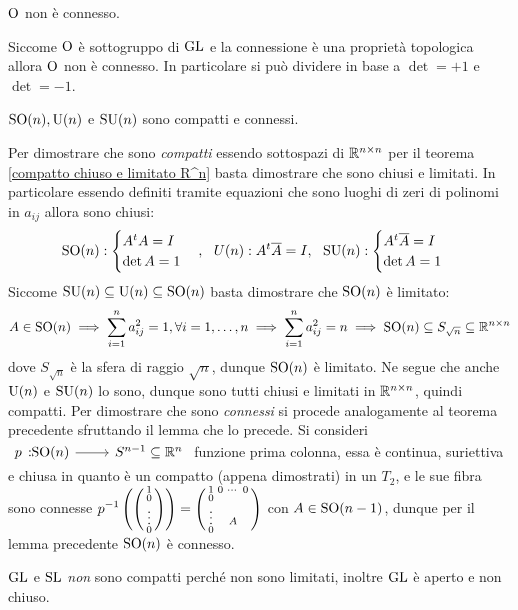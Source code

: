 \begin{corollary}
	$\operatorname{O}$ non è connesso.	
\end{corollary}
\begin{demonstration}
	Siccome $\operatorname{O}$ è sottogruppo di $\operatorname{GL}$ e la connessione è una proprietà topologica allora $\operatorname{O}$ non è connesso. In particolare si può dividere in base a $\det =+1$ e $\det =-1$.
\end{demonstration}

\begin{theorema}
	$\operatorname{SO}(n), \operatorname{U}(n)	$ e $\operatorname{SU}(n)$ sono compatti e connessi.
\end{theorema}
\begin{demonstration}
	Per dimostrare che sono \textit{compatti} essendo sottospazi di $\mathbb{R}^{n\times n}$ per il teorema \ref{compatto chiuso e limitato R^n} basta dimostrare che sono chiusi e limitati. In particolare essendo definiti tramite equazioni che sono luoghi di zeri di polinomi in $a_{ij}$ allora sono chiusi:
		\begin{gather*}
			\operatorname{SO}(n):\begin{cases}
					A^{t}A=I\\
					\det A=1
				\end{cases}, \ \
			U(n): A^{t}\overline{A}=I, \ \
			\operatorname{SU}(n): \begin{cases}
				A^{t}\overline{A}=I\\
				\det A=1
			\end{cases}
		\end{gather*}
	Siccome $\operatorname{SU}(n)\subseteq \operatorname{U}(n)\subseteq \operatorname{SO}(n)$ basta dimostrare che $\operatorname{SO}(n)$ è limitato:
		\begin{gather*}
			A\in\operatorname{SO}(n) \implies \sum_{i=1}^n a_{ij}^2=1, \forall i=1,\dots,n \implies \sum_{i=1}^n a_{ij}^2=n \implies \operatorname{SO}(n)\subseteq S_{\sqrt{n}}\subseteq\mathbb{R}^{n\times n}\\
		\end{gather*}
	dove $S_{\sqrt{n}}$ è la sfera di raggio $\sqrt{n}$, dunque $\operatorname{SO}(n)$ è limitato. Ne segue che anche $\operatorname{U}(n)$ e $\operatorname{SU}(n)$ lo sono, dunque sono tutti chiusi e limitati in $\mathbb{R}^{n\times n}$, quindi compatti. \newline
	Per dimostrare che sono \textit{connessi} si procede analogamente al teorema precedente sfruttando il lemma che lo precede. Si consideri $\funz p {\So(n)} {S^{n-1}\subseteq \realset^n}$ funzione prima colonna, essa è continua, suriettiva e chiusa in quanto è un compatto (appena dimostrati) in un $T_2$, e le sue fibra sono connesse $\displaystyle p^{-1}\left( \begin{psmallmatrix} 1 \\ 0 \\ \vdots \\ 0 \end{psmallmatrix} \right) = \begin{psmallmatrix}
		1      & 0 & \cdots & 0\\
		0      &   &       &  \\
		\vdots &   & A     &  \\
		0      &   &       &
	\end{psmallmatrix}$ con $A\in \operatorname{SO}(n-1)$, dunque per il lemma precedente $\operatorname{SO}(n)$ è connesso.
\end{demonstration}

\begin{observe}
	$\operatorname{GL}$ e $\operatorname{SL}$ \textit{non} sono compatti perché non sono limitati, inoltre $\operatorname{GL}$ è aperto e non chiuso.
\end{observe}